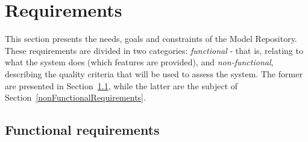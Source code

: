 \section{Requirements}
\label{requirementsSurvey}
This section presents the needs, goals and constraints of the \ddmore Model Repository. These requirements are divided in two categories: \textit{functional} - that is, relating to what the \gls{system} does (which features are provided), and \textit{non-functional}, describing the quality criteria that will be used to assess the system. The former are presented in Section~\ref{functionalRequirements}, while the latter are the subject of Section~\ref{nonFunctionalRequirements}.

\subsection{Functional requirements}
\label{functionalRequirements}

